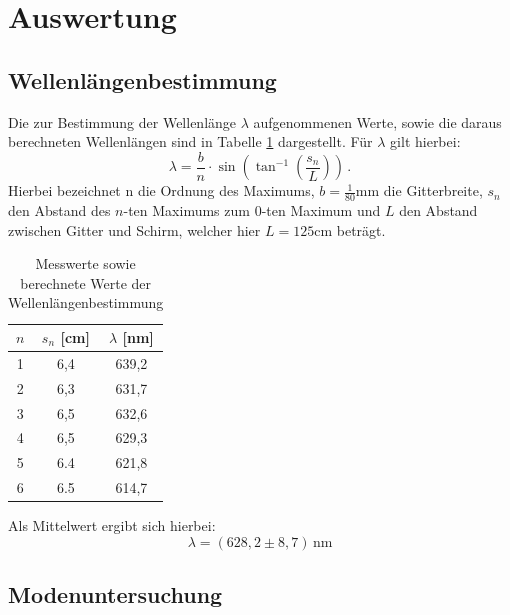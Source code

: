 \section{Auswertung}
\subsection{Wellenlängenbestimmung}
Die zur Bestimmung der Wellenlänge $\lambda$ aufgenommenen Werte, sowie die daraus berechneten Wellenlängen sind in Tabelle \ref{welltab} dargestellt. Für $\lambda$ gilt hierbei:
\begin{equation}
  \lambda = \frac{b}{n}\cdot\sin\left(\tan^{-1}\left(\frac{s_n}{L}\right)\right) \, .
\end{equation}
Hierbei bezeichnet n die Ordnung des Maximums, $b=\frac{1}{80}\si{\milli\meter}$ die Gitterbreite, $s_n$ den Abstand des $n$-ten Maximums zum $0$-ten Maximum und $L$ den Abstand zwischen Gitter und Schirm,
welcher hier $L=125 \si{\centi\meter}$ beträgt.
\begin{table}[H]
  \centering
\begin{tabular}{c|c|c}
$n$  & $s_n$ [cm]    & $\lambda$ [nm]     \\
\hline
1 & 6,4 & 639,2 \\
2 & 6,3 & 631,7 \\
3 & 6,5 & 632,6 \\
4 & 6,5 & 629,3 \\
5 & 6.4 & 621,8 \\
6 & 6.5 & 614,7
\end{tabular}
\caption{Messwerte sowie berechnete Werte der Wellenlängenbestimmung}
\label{welltab}
\end{table}
Als Mittelwert ergibt sich hierbei:
\begin{equation}
  \lambda= (628,2 \pm 8,7) \, \si{\nano\meter}
\end{equation}
\subsection{Modenuntersuchung}

